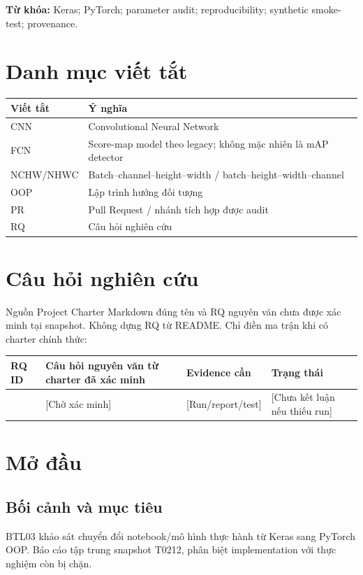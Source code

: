 \noindent\textbf{Từ khóa:} Keras; PyTorch; parameter audit; reproducibility; synthetic smoke-test; provenance.

\chapter*{Danh mục viết tắt}
\begin{tabularx}{\textwidth}{lY}
\toprule Viết tắt & Ý nghĩa \\
\midrule
CNN & Convolutional Neural Network \\
FCN & Score-map model theo legacy; không mặc nhiên là mAP detector \\
NCHW/NHWC & Batch–channel–height–width / batch–height–width–channel \\
OOP & Lập trình hướng đối tượng \\
PR & Pull Request / nhánh tích hợp được audit \\
RQ & Câu hỏi nghiên cứu \\
\bottomrule
\end{tabularx}

\chapter*{Câu hỏi nghiên cứu}
Nguồn Project Charter Markdown đúng tên và RQ nguyên văn chưa được xác minh tại snapshot. Không dựng RQ từ README. Chỉ điền ma trận khi có charter chính thức:
\begin{longtable}{p{}p{}p{}p{}}
\toprule RQ ID & Câu hỏi nguyên văn từ charter đã xác minh & Evidence cần & Trạng thái \\
\midrule
[RQ ID] & [Chờ xác minh] & [Run/report/test] & [Chưa kết luận nếu thiếu run] \\
\bottomrule
\end{longtable}

\chapter*{Mở đầu}
\section*{Bối cảnh và mục tiêu}
BTL03 khảo sát chuyển đổi notebook/mô hình thực hành từ Keras sang PyTorch OOP. Báo cáo tập trung snapshot T0212, phân biệt implementation với thực nghiệm còn bị chặn.

